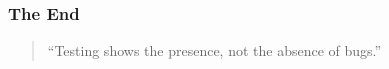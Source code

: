 

\begin{frame}
    \frametitle{The End}

    \begin{quote}
        ``Testing shows the presence, not the absence of bugs.''
    \end{quote}
\end{frame}



